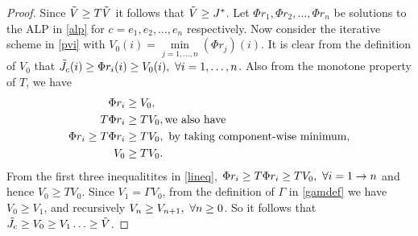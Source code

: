 \begin{proof}
Since $\tilde{V}\geq T\tilde{V}$ it follows that $\tilde{V}\geq J^*$. Let $\Phi r_1, \Phi r_2,\ldots,\Phi r_n$ be solutions to the ALP in \eqref{alp} for $c=e_1, e_2,\ldots,e_n$ respectively. Now consider the iterative scheme in \eqref{pvi} with $V_0(i)=\underset{j=1,\ldots, n}{\min}(\Phi r_j)(i)$. It is clear from the definition of $V_0$ that $\tilde{J}_c(i)\geq\Phi r_i(i)\geq V_0(i),\mbox{ } \forall i=1,\ldots,n$. Also from the monotone property of $T$, we have 
\begin{align}\label{lineq}
\Phi r_i&\geq V_0,\nonumber\\
T\Phi r_i&\geq T V_0,\mbox{we also have}\nonumber\\
\Phi r_i\geq T\Phi r_i&\geq T V_0,\mbox{ }\text{by taking component-wise minimum},\nonumber\\
V_0&\geq T V_0.
\end{align}
From the first three inequalitites in \eqref{lineq}, $\Phi r_i\geq T \Phi r_i\geq T V_0, \mbox{ }\forall i=1\to n$ and hence $V_0\geq TV_0$. Since $V_1=\Gamma V_0$, from the definition of $\Gamma$ in \eqref{gamdef} we have $V_0\geq V_1$, and recursively $V_{n}\geq V_{n+1}, \mbox{ }\forall n\geq 0$. So it follows that $\tilde{J}_c\geq V_0\geq V_1\ldots\geq \tilde{V}$.
\end{proof}

